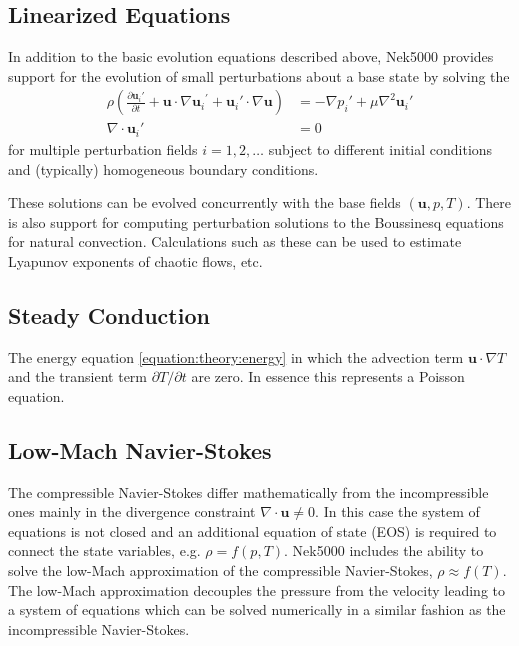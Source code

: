 \documentclass[letterpaper,10pt,english]{sphinxmanual}
\begin{document}
\subsection{Linearized Equations}
\label{\detokenize{theory:intro-linear-eq}}\label{\detokenize{theory:linearized-equations}}
In addition to the basic evolution equations described above, Nek5000 provides support for the
evolution of small perturbations about a base state by solving the 
\begin{equation}\label{equation:theory:pertu}
\begin{split}\rho\left(\frac{\partial \mathbf u_i'}{\partial t} + \mathbf u \cdot \nabla {\mathbf u_i}^{'} + \mathbf u_i' \cdot \nabla \mathbf u \right) &=
- \nabla p_i' + \mu \nabla^2 \mathbf u_i'\\
\nabla \cdot \mathbf u_i' &= 0 \nonumber\end{split}
\end{equation}
for multiple perturbation fields \(i=1,2,\dots\) subject to different initial
conditions and (typically) homogeneous boundary conditions.

These solutions can be evolved concurrently with the base fields \((\mathbf u,p,T)\).  There is
also support for computing perturbation solutions to the Boussinesq equations for natural
convection.  Calculations such as these can be used to estimate Lyapunov exponents of chaotic
flows, etc.


\subsection{Steady Conduction}
\label{\detokenize{theory:steady-conduction}}\label{\detokenize{theory:intro-steady-conduct}}
The energy equation \eqref{equation:theory:energy} in which the advection term \(\mathbf u \cdot \nabla T\) and the
transient term \(\partial T/\partial t\) are zero. In essence this represents a Poisson equation.


\subsection{Low-Mach Navier-Stokes}
\label{\detokenize{theory:intro-low-mach}}\label{\detokenize{theory:low-mach-navier-stokes}}
The compressible Navier-Stokes differ mathematically from the incompressible ones mainly in the
divergence constraint \(\nabla \cdot \mathbf u\neq 0\).
In this case the system of equations is not closed and an additional equation of state (EOS) is required to connect the state variables, e.g. \(\rho=f(p,T)\).
Nek5000 includes the ability to solve the low-Mach approximation of the compressible Navier-Stokes, \(\rho\approx f(T)\).
The low-Mach approximation decouples the pressure from the velocity leading to a system of equations which can be solved numerically in a similar fashion as the incompressible Navier-Stokes.
\end{document}
